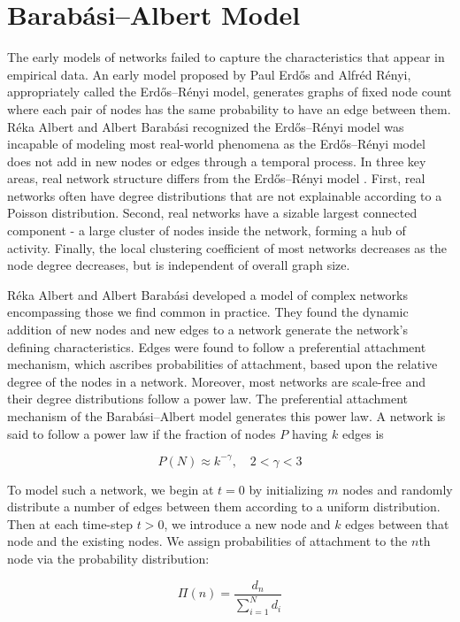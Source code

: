 \chapter{Barabási–Albert Model}
\label{section:BA model}
The early models of networks failed to capture the characteristics that appear in empirical data. An
 early model proposed by Paul Erdős and Alfréd Rényi, appropriately called the Erdős–Rényi model, generates
graphs of fixed node count where each pair of nodes has the same probability to have an edge between them. 
Réka Albert and Albert Barabási recognized the Erdős–Rényi model 
was incapable of modeling most real-world phenomena as the Erdős–Rényi model does not add
in new nodes or edges through a temporal process. 
In three key areas, real network structure differs from
the Erdős–Rényi model \cite{barabasi2016network}.
 First, real networks often have degree distributions 
that are not explainable according to a Poisson distribution.
Second, real networks have a sizable largest connected component - a large cluster 
of nodes inside the network, forming a hub of activity.
 Finally, the local clustering coefficient of most networks
decreases as the node degree decreases, but is independent of overall graph size.

Réka Albert and Albert Barabási developed a model of complex networks 
encompassing those we find common in practice. They found the dynamic addition
of new nodes and new edges to a network generate the network's defining characteristics.
Edges were found to follow a preferential attachment
mechanism, which ascribes probabilities of attachment, based upon the relative degree of the nodes in a network. 
Moreover, most networks are scale-free and their degree distributions follow a power law.
The preferential attachment mechanism of the Barabási–Albert model generates this power law.
A network is said to follow a power law if the fraction of nodes $P$ having $k$ edges is 

$$
P(N) \approx k^{-\gamma} , \quad 2< \gamma <3
$$



To model such a network, we begin at $t=0$ by initializing $m$ nodes and randomly distribute a number of edges between them
according to a uniform distribution. Then at each time-step $t > 0$, we introduce a new node 
and $k$ edges between that node and the existing nodes. We assign probabilities of attachment to the $n$th node via the
 probability distribution:

$$
\Pi(n) = \frac{d_n}{\sum^{N}_{i=1} d_i}
$$

